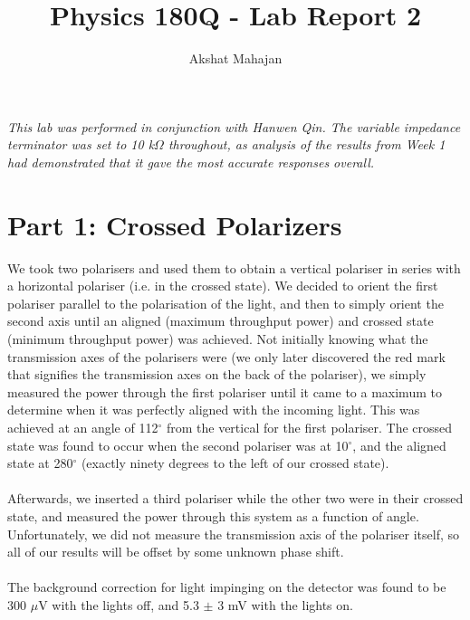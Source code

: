 \documentclass[10pt,a4paper]{article}
\author{Akshat Mahajan}
\title{Physics 180Q - Lab Report 2}
\begin{document}
\maketitle

\textsl{This lab was performed in conjunction with Hanwen Qin. The variable impedance terminator was set to 10 k$\Omega$ throughout, as analysis of the results from Week 1 had demonstrated that it gave the most accurate responses overall.}

\section*{Part 1: Crossed Polarizers}

We took two polarisers and used them to obtain a vertical polariser in series with a horizontal polariser (i.e. in the crossed state). We decided to orient the first polariser parallel to the polarisation of the light, and then to simply orient the second axis until an aligned (maximum throughput power) and crossed state (minimum throughput power)  was achieved. Not initially knowing what the transmission axes of the polarisers were (we only later discovered the red mark that signifies the transmission axes on the back of the polariser), we simply measured the power through the first polariser until it came to a maximum to determine when it was perfectly aligned with the incoming light. This was achieved at an angle of 112$^{\circ}$ from the vertical for the first polariser. The crossed state was found to occur when the second polariser was at 10$^{\circ}$, and the aligned state at 280$^{\circ}$ (exactly ninety degrees to the left of our crossed state).\\
\\
Afterwards, we inserted a third polariser while the other two were in their crossed state, and measured the power through this system as a function of angle. Unfortunately, we did not measure the transmission axis of the polariser itself, so all of our results will be offset by some unknown phase shift.\\ 
\\
The background correction for light impinging on the detector was found to be 300 $\mu$V with the lights off, and 5.3 $\pm$ 3 mV with the lights on.
\end{document}
